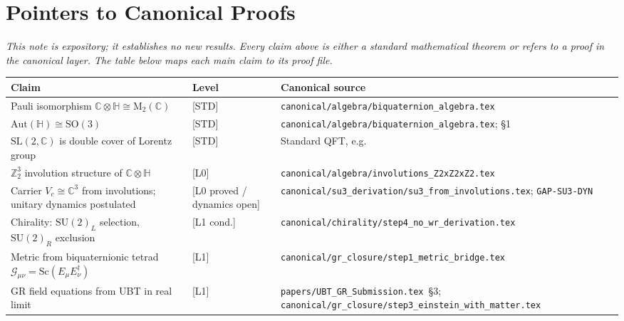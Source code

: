 \documentclass[12pt,a4paper]{article}
\theoremstyle{definition}
\theoremstyle{remark}
\begin{document}
\section{Pointers to Canonical Proofs}
\label{sec:pointers}

\textit{This note is expository; it establishes no new results.  Every claim
above is either a standard mathematical theorem or refers to a proof in the
canonical layer.  The table below maps each main claim to its proof file.}

\begin{pointerbox}
\renewcommand{\arraystretch}{1.4}
\small
\begin{tabular}{>{\raggedright\arraybackslash}p{5.0cm}
                >{\raggedright\arraybackslash}p{1.8cm}
                >{\raggedright\arraybackslash}p{6.2cm}}
  \toprule
  \textbf{Claim} & \textbf{Level} & \textbf{Canonical source} \\
  \midrule
  Pauli isomorphism
    $\mathbb{C}\otimes\mathbb{H}\cong\mathrm{M}_2(\mathbb{C})$
  & {[STD]}
  & \texttt{canonical/algebra/}\linebreak\texttt{biquaternion\_algebra.tex} \\
  $\mathrm{Aut}(\mathbb{H})\cong\mathrm{SO}(3)$
  & {[STD]}
  & \texttt{canonical/algebra/}\linebreak\texttt{biquaternion\_algebra.tex};
    \cite{adler1995} §1 \\
  $\mathrm{SL}(2,\mathbb{C})$ is double cover of Lorentz group
  & {[STD]}
  & Standard QFT, e.g.\ \cite{mtw1973} \\
  $\mathbb{Z}_2^3$ involution structure of $\mathbb{C}\otimes\mathbb{H}$
  & {[L0]}
  & \texttt{canonical/algebra/}\linebreak\texttt{involutions\_Z2xZ2xZ2.tex} \\
  Carrier $V_c\cong\mathbb{C}^3$ from involutions; unitary dynamics postulated
  & {[L0 proved / dynamics open]}
  & \texttt{canonical/su3\_derivation/}\linebreak\texttt{su3\_from\_involutions.tex};
    \texttt{GAP-SU3-DYN} \\
  Chirality: $\mathrm{SU}(2)_L$ selection, $\mathrm{SU}(2)_R$ exclusion
  & {[L1 cond.]}
  & \texttt{canonical/chirality/}\linebreak\texttt{step4\_no\_wr\_derivation.tex} \\
  Metric from biquaternionic tetrad
    $\mathcal{G}_{\mu\nu}=\mathrm{Sc}(E_\mu E_\nu^\dagger)$
  & {[L1]}
  & \texttt{canonical/gr\_closure/}\linebreak\texttt{step1\_metric\_bridge.tex} \\
  GR field equations from UBT in real limit
  & {[L1]}
  & \texttt{papers/UBT\_GR\_Submission.tex}~§3;
    \texttt{canonical/gr\_closure/}\linebreak\texttt{step3\_einstein\_with\_matter.tex} \\
  \bottomrule
\end{tabular}
\end{pointerbox}
\end{document}
